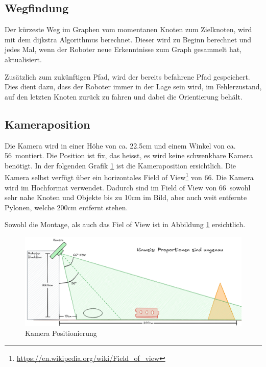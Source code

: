 \subsection{Wegfindung}

Der kürzeste Weg im Graphen vom momentanen Knoten zum Zielknoten, wird mit dem \gls{dijkstra} Algorithmus berechnet. Dieser wird zu Beginn berechnet und jedes Mal, wenn der Roboter neue Erkenntnisse zum Graph gesammelt hat, aktualisiert. 

Zusätzlich zum zukünftigen Pfad, wird der bereits befahrene Pfad gespeichert. Dies dient dazu, dass der Roboter immer in der Lage sein wird, im Fehlerzustand, auf den letzten Knoten zurück zu fahren und dabei die Orientierung behält.

\subsection{Kameraposition}

Die Kamera wird in einer Höhe von ca. 22.5cm und einem Winkel von ca. 56\textdegree\ montiert. Die Position ist fix, das heisst, es wird keine schwenkbare Kamera benötigt. In der folgenden Grafik \ref{fig:camera-position-concept} ist die Kameraposition ersichtlich. Die Kamera selbst verfügt über ein horizontales Field of View\footnote{\url{https://en.wikipedia.org/wiki/Field_of_view}} von 66\textdegree. Die Kamera wird im Hochformat verwendet. Dadurch sind im Field of View von 66\textdegree\ sowohl sehr nahe Knoten und Objekte bis zu 10cm im Bild, aber auch weit entfernte Pylonen, welche 200cm entfernt stehen.

Sowohl die Montage, als auch das Fiel of View ist in Abbildung \ref{fig:camera-position-concept} ersichtlich.

\begin{figure}[H]
    \centering
    \includegraphics[width=1\linewidth]{assets//informatik-prototyp//camera/camera_position.png}
    \caption{Kamera Positionierung}
    \label{fig:camera-position-concept}
\end{figure}



